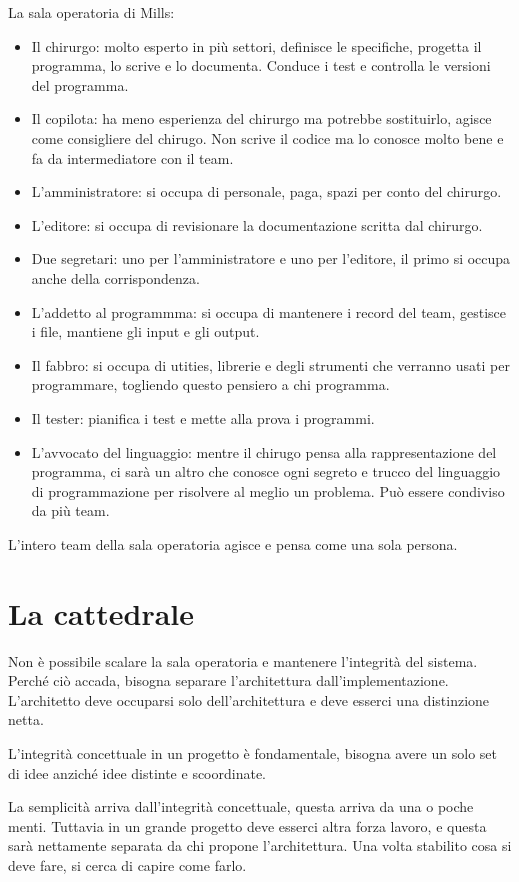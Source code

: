 \documentclass[a4paper,12pt,titlepage,oneside]{book}
\begin{document}
La sala operatoria di Mills:
\begin{itemize}
    \item Il chirurgo: molto esperto in più settori, definisce le specifiche, progetta il programma, lo scrive e lo documenta. Conduce i test e controlla le versioni del programma.
    \item Il copilota: ha meno esperienza del chirurgo ma potrebbe sostituirlo, agisce come consigliere del chirugo. Non scrive il codice ma lo conosce molto bene e fa da intermediatore con il team.
    \item L'amministratore: si occupa di personale, paga, spazi per conto del chirurgo.
    \item L'editore: si occupa di revisionare la documentazione scritta dal chirurgo.
    \item Due segretari: uno per l'amministratore e uno per l'editore, il primo si occupa anche della corrispondenza.
    \item L'addetto al programmma: si occupa di mantenere i record del team, gestisce i file, mantiene gli input e gli output.
    \item Il fabbro: si occupa di utities, librerie e degli strumenti che verranno usati per programmare, togliendo questo pensiero a chi programma.
    \item Il tester: pianifica i test e mette alla prova i programmi.
    \item L'avvocato del linguaggio: mentre il chirugo pensa alla rappresentazione del programma, ci sarà un altro che conosce ogni segreto e trucco del linguaggio di programmazione per risolvere al meglio un problema. Può essere condiviso da più team.
\end{itemize}
L'intero team della sala operatoria agisce e pensa come una sola persona.

\section{La cattedrale}
Non è possibile scalare la sala operatoria e mantenere l'integrità del sistema. Perché ciò accada, bisogna separare l'architettura dall'implementazione. L'architetto deve occuparsi solo dell'architettura e deve esserci una distinzione netta.

L'integrità concettuale in un progetto è fondamentale, bisogna avere un solo set di idee anziché idee distinte e scoordinate.

La semplicità arriva dall'integrità concettuale, questa arriva da una o poche menti. Tuttavia in un grande progetto deve esserci altra forza lavoro, e questa sarà nettamente separata da chi propone l'architettura. Una volta stabilito cosa si deve fare, si cerca di capire come farlo.
\end{document}
